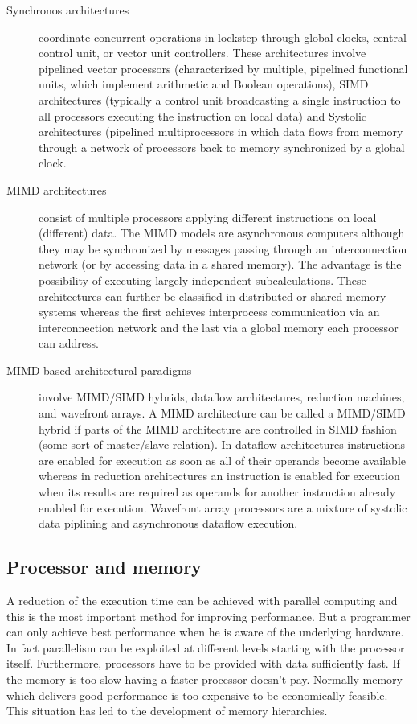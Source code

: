 \begin{description}
\item[Synchronos architectures] coordinate concurrent operations in
  lockstep through global clocks, central control unit, or vector unit
  controllers. These architectures involve pipelined vector processors
  (characterized by multiple, pipelined functional units, which
  implement arithmetic and Boolean operations), SIMD architectures
  (typically a control unit broadcasting a single instruction to
  all processors executing the instruction on local data) and Systolic
  architectures (pipelined multiprocessors in which data flows from
  memory through a network of processors back to memory synchronized
  by a global clock. 
\item[MIMD architectures] consist of multiple processors applying
  different instructions on local (different) data. The MIMD models
  are asynchronous computers although they may be synchronized by
  messages passing through an interconnection network (or by accessing
  data in a shared memory). The advantage is the possibility of
  executing largely independent subcalculations. These architectures
  can further be classified in distributed or shared memory systems
  whereas the first achieves interprocess communication via an
  interconnection network and the last via a global memory each
  processor can address.
\item[MIMD-based architectural paradigms] involve MIMD/SIMD hybrids,
  dataflow architectures, reduction machines, and wavefront arrays. A
  MIMD architecture can be called a MIMD/SIMD hybrid if parts of the
  MIMD architecture are controlled in SIMD fashion (some sort of
  master/slave relation). In dataflow architectures instructions are
  enabled for execution as soon as all of their operands become
  available whereas in reduction architectures an instruction is
  enabled for execution when its results are required as operands for
  another instruction already enabled for execution. Wavefront array
  processors are a mixture of systolic data piplining and asynchronous
  dataflow execution.
\end{description}

\subsection{Processor and memory}

A reduction of the execution time can be achieved with parallel
computing and this is the most important method for improving
performance. But a programmer can only achieve best performance when
he is aware of the underlying hardware. In fact parallelism can be
exploited at different levels starting with the processor
itself. Furthermore, processors have to be provided with data
sufficiently fast. If the memory is too slow having a faster processor
doesn't pay. Normally memory which delivers good performance is too
expensive to be economically feasible. This situation has led to the
development of memory hierarchies.


